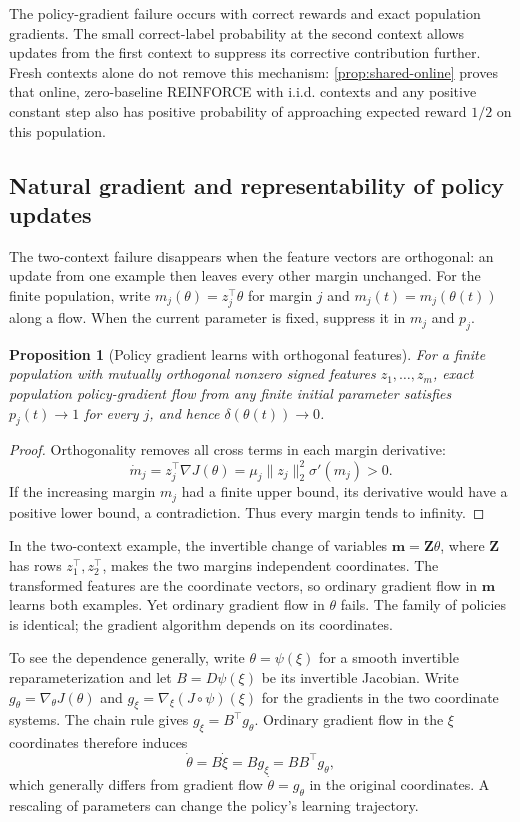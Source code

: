 \documentclass[11pt,twoside]{article}
\newtheorem{proposition}[theorem]{Proposition}
\theoremstyle{definition}
\theoremstyle{remark}
\begin{document}
The policy-gradient failure occurs with correct rewards and exact population
gradients. The small correct-label probability at the second context allows
updates from the first context to suppress its corrective contribution further.
Fresh contexts alone do not remove this mechanism:
\cref{prop:shared-online} proves that online, zero-baseline REINFORCE with
i.i.d. contexts and any positive constant step also has positive probability
of approaching expected reward $1/2$ on this population.

\subsection{Natural gradient and representability of policy updates}

The two-context failure disappears when the feature vectors are orthogonal:
an update from one example then leaves every other margin unchanged.
For the finite population, write $m_j(\theta)=z_j^\top\theta$ for
margin $j$ and $m_j(t)=m_j(\theta(t))$ along a flow. When the current
parameter is fixed, suppress it in $m_j$ and $p_j$.

\begin{proposition}[Policy gradient learns with orthogonal features]
\label{prop:orthogonal-pg}
For a finite population with mutually orthogonal nonzero signed features
$z_1,\ldots,z_m$, exact population policy-gradient flow from any finite
initial parameter satisfies $p_j(t)\to1$ for every $j$, and hence
$\delta(\theta(t))\to0$.
\end{proposition}
\begin{proof}
Orthogonality removes all cross terms in each margin derivative:
\[
 \dot m_j=z_j^\top\nabla J(\theta)
 =\mu_j\|z_j\|_2^2\sigma'(m_j)>0.
\]
If the increasing margin $m_j$ had a finite upper bound, its derivative
would have a positive lower bound, a contradiction. Thus every margin
tends to infinity.
\end{proof}

In the two-context example, the invertible change of variables
$\boldsymbol m=\mathbf Z\theta$, where $\mathbf Z $ has rows $z_1^\top,z_2^\top$, makes the
two margins independent coordinates. The transformed features are the
coordinate vectors, so ordinary gradient flow in $\boldsymbol m$ learns both examples.
Yet ordinary gradient flow in $\theta$ fails. The family of policies is
identical; the gradient algorithm depends on its coordinates.

To see the dependence generally, write $\theta=\psi(\xi)$ for a
smooth invertible reparameterization and let $B=D\psi(\xi)$ be its
invertible Jacobian. Write $g_\theta=\nabla_\theta J(\theta)$ and
$g_\xi=\nabla_\xi(J\circ\psi)(\xi)$ for the gradients in the two
coordinate systems. The chain rule gives $g_\xi=B^\top g_\theta$.
Ordinary gradient flow in the $\xi$ coordinates therefore induces
\[
 \dot\theta=B\dot\xi=Bg_\xi=BB^\top g_\theta,
\]
which generally differs from gradient flow $\dot\theta=g_\theta$ in the
original coordinates. A rescaling of parameters can change the policy's
learning trajectory.
\end{document}
